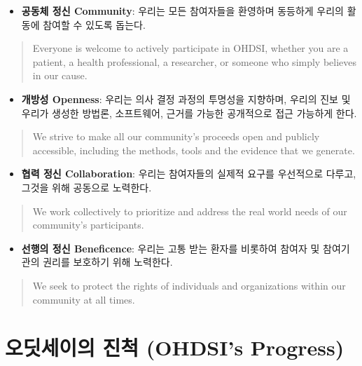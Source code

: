 \documentclass[11pt]{book}
\providecommand{\tightlist}{%
  \setlength{\itemsep}{0pt}\setlength{\parskip}{0pt}}
\theoremstyle{definition}
\theoremstyle{definition}
\theoremstyle{definition}
\theoremstyle{remark}
\begin{document}
\begin{itemize}
\tightlist
\item
  \textbf{공동체 정신 Community}: 우리는 모든 참여자들을 환영하며
  동등하게 우리의 활동에 참여할 수 있도록 돕는다.
\end{itemize}

\begin{quote}
Everyone is welcome to actively participate in OHDSI, whether you are a
patient, a health professional, a researcher, or someone who simply
believes in our cause.
\end{quote}

\begin{itemize}
\tightlist
\item
  \textbf{개방성 Openness}: 우리는 의사 결정 과정의 투명성을 지향하며,
  우리의 진보 및 우리가 생성한 방법론, 소프트웨어, 근거를 가능한
  공개적으로 접근 가능하게 한다.
\end{itemize}

\begin{quote}
We strive to make all our community's proceeds open and publicly
accessible, including the methods, tools and the evidence that we
generate.
\end{quote}

\begin{itemize}
\tightlist
\item
  \textbf{협력 정신 Collaboration}: 우리는 참여자들의 실제적 요구를
  우선적으로 다루고, 그것을 위해 공동으로 노력한다.
\end{itemize}

\begin{quote}
We work collectively to prioritize and address the real world needs of
our community's participants.
\end{quote}

\begin{itemize}
\tightlist
\item
  \textbf{선행의 정신 Beneficence}: 우리는 고통 받는 환자를 비롯하여
  참여자 및 참여기관의 권리를 보호하기 위해 노력한다.
\end{itemize}

\begin{quote}
We seek to protect the rights of individuals and organizations within
our community at all times.
\end{quote}


\section{오딧세이의 진척 (OHDSI's Progress)}\label{--ohdsis-progress}
\end{document}
